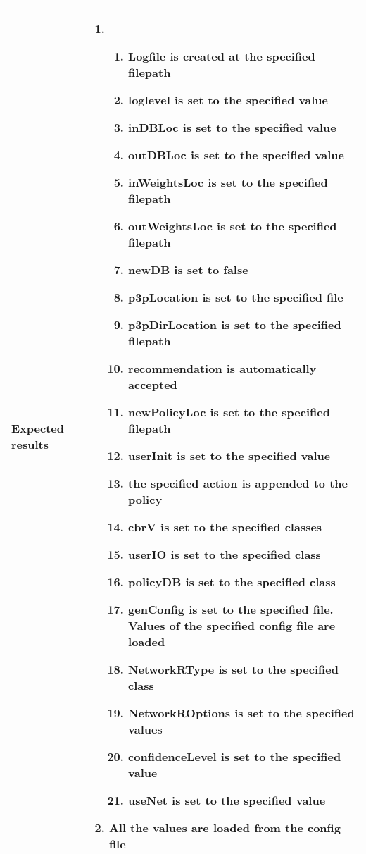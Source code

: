 \documentclass[10pt]{article}
\begin{document}
\begin{center}
\begin{longtable}{ | p{4cm} | p{10cm} | }
			Expected results & 	\begin{enumerate}
							\item
							\begin{enumerate}
								\item Logfile is created at the specified filepath
								\item loglevel is set to the specified value
								\item inDBLoc is set to the specified value
								\item outDBLoc is set to the specified value
								\item inWeightsLoc is set to the specified filepath
								\item outWeightsLoc is set to the specified filepath
								\item newDB is set to false
								\item p3pLocation is set to the specified file
								\item p3pDirLocation is set to the specified filepath
								\item recommendation is automatically accepted
								\item newPolicyLoc is set to the specified filepath
								\item userInit is set to the specified value
								\item the specified action is appended to the policy
								\item cbrV is set to the specified classes
								\item userIO is set to the specified class
								\item policyDB is set to the specified class
								\item genConfig is set to the specified file. Values of the specified config file are loaded
								\item NetworkRType is set to the specified class
								\item NetworkROptions is set to the specified values
								\item confidenceLevel is set to the specified value
								\item useNet is set to the specified value
							\end{enumerate}
							\item All the values are loaded from the config file
						\end{enumerate} \\ [3pt] \hline


\end{longtable}
\end{center}
\end{document}
